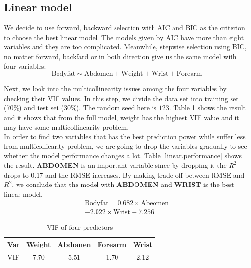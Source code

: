 \documentclass[11pt, twocolumn]{article}
\begin{document}
\subsection{Linear model}
We decide to use forward, backward selection with AIC and BIC as the criterion to choose the best linear model. The models given by AIC have more than eight variables and they are too complicated. Meanwhile, stepwise selection using BIC, no matter forward, backfard or in both direction give us the same model with four variables:
\begin{equation*}
\text{Bodyfat} \sim \text{Abdomen} + \text{Weight} + \text{Wrist} + \text{Forearm}
\end{equation*}

Next, we look into the multicollinearity issues among the four variables by checking their VIF values. In this step, we divide the data set into training set (70\%) and test set (30\%). The random seed here is $123$. Table \ref{vif} shows the result and it shows that from the full model, weight has the highest VIF value and it may have some multicollinearity problem. 
\\

In order to find two variables that has the best prediction power while suffer less from multicolliearity problem, we are going to drop the variables gradually to see whether the model performance changes a lot. Table \ref{linear.performance} shows the result. \textbf{ABDOMEN} is an important variable since by dropping it the $R^2$ drops to 0.17 and the RMSE increases. By making trade-off between RMSE and $R^2$, we conclude that the model with \textbf{ABDOMEN} and \textbf{WRIST} is the best linear model.
\begin{align*}
\text{Bodyfat} = 0.682 \times \text{Abeomen}\\
			    -2.022 \times \text{Wrist} -7.256
\end{align*}

\begin{table}
\centering
\begin{tabular}{l | c c c c }
\hline
Var & Weight & Abdomen & Forearm & Wrist \\
\hline 
VIF & 7.70 & 5.51 & 1.70 & 2.12 \\ 
\hline
\end{tabular}
\caption{VIF of four predictors}
\label{vif}
\end{table}
\end{document}
